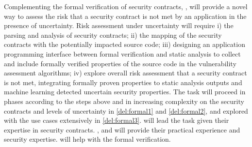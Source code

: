 \begin{Workpackage}{\thewpno}
\begin{Task}

\TaskResults{%
\ref{del:formal1},
\ref{del:formal2},
\ref{del:formal3}
}
\TaskHeader{}

Complementing the formal verification of security contracts, \theTask, will provide a novel way to assess the risk that a security contract is not met by an application in the presence of 
uncertainty. %
Risk assessment under uncertainty will require i) the parsing and analysis of security contracts; ii) the mapping of the security contracts with the potentially impacted source code;
iii) designing an application programming interface between formal verification and static analysis to collect and include formally verified properties of the source code in the vulnerability assessment algorithms;
iv) explore overall risk assessment that a security contract is not met, integrating formally proven properties to static analysis outputs and machine learning detected uncertain security properties. 
The task will proceed in phases according to the steps above and in increasing complexity on the security contracts and levels of uncertainty in \ref{del:formal1} and \ref{del:formal2}, and explored with the use cases extensively in 
\ref{del:formal3}.
\UCM will lead the task given their expertise in security contracts.  \IBMshort, \YAGshort and \SOPRAshort will provide their practical experience and security expertise. \SA will help with the formal verification.


\end{Task}
\end{Workpackage}
